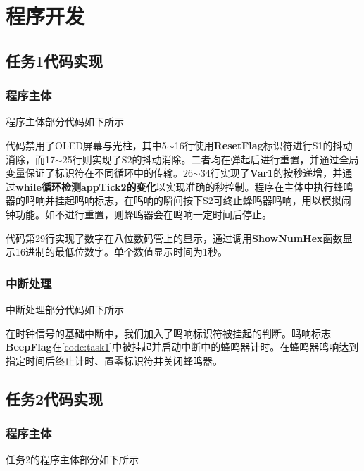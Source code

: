 \documentclass[12pt]{article}
\begin{document}
\section{程序开发}
\subsection{任务1代码实现}

\subsubsection{程序主体}

程序主体部分代码如下所示


代码禁用了OLED屏幕与光柱，其中5$\sim$16行使用\textbf{ResetFlag}标识符进行S1的抖动消除，而17$\sim$25行则实现了S2的抖动消除。二者均在弹起后进行重置，并通过全局变量保证了标识符在不同循环中的传输。26$\sim$34行实现了\textbf{Var1}的按秒递增，并通过\textbf{while循环检测appTick2的变化}以实现准确的秒控制。程序在主体中执行蜂鸣器的鸣响并挂起鸣响标志，在鸣响的瞬间按下S2可终止蜂鸣器鸣响，用以模拟闹钟功能。如不进行重置，则蜂鸣器会在鸣响一定时间后停止。

代码第29行实现了数字在八位数码管上的显示，通过调用\textbf{ShowNumHex}函数显示16进制的最低位数字。单个数值显示时间为1秒。
\subsubsection{中断处理}

中断处理部分代码如下所示


在时钟信号的基础中断中，我们加入了鸣响标识符被挂起的判断。鸣响标志\textbf{BeepFlag}在\autoref{code:task1}中被挂起并启动中断中的蜂鸣器计时。在蜂鸣器鸣响达到指定时间后终止计时、置零标识符并关闭蜂鸣器。

\subsection{任务2代码实现}

\subsubsection{程序主体}

任务2的程序主体部分如下所示

\end{document}
